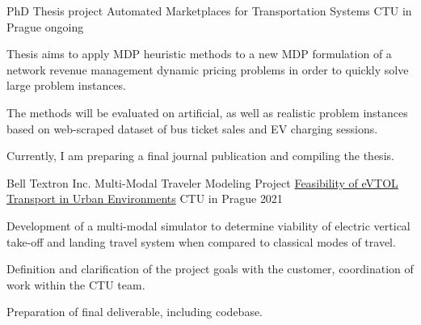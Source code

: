 

\begin{cventries}

  \cventry
    {PhD Thesis project} %
    {Automated Marketplaces for Transportation Systems} %
    {CTU in Prague} %
    {ongoing} %
    {
      \begin{cvitems} %
        \item {Thesis aims to apply MDP heuristic methods to a new MDP formulation of a network revenue management dynamic pricing problems in order to quickly solve large problem instances.}
        \item {The methods will be evaluated on artificial, as well as realistic problem instances based on web-scraped dataset of bus ticket sales and EV charging sessions.}
        \item {Currently, I am preparing a final journal publication and compiling the thesis.}
      \end{cvitems}
    }

  \cventry
    {Bell Textron Inc. Multi-Modal Traveler Modeling Project} %
    {\href{https://www.aic.fel.cvut.cz/projects/passenger-decision-modeling-in-a-multi-modal-urban-environment}{Feasibility of eVTOL Transport in Urban Environments}} %
    {CTU in Prague} %
    {2021} %
    {
      \begin{cvitems} %
        \item {Development of a multi-modal simulator to determine viability of electric vertical take-off and landing travel system when compared to classical modes of travel.}
        \item {Definition and clarification of the project goals with the customer, coordination of work within the CTU team.}
        \item {Preparation of final deliverable, including codebase. }
      \end{cvitems}
    }


\end{cventries}
